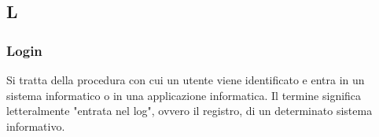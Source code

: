 \subsection{L}

\subsubsection{Login}
Si tratta della procedura con cui un utente viene identificato e entra in un sistema informatico o in una applicazione informatica.
Il termine significa letteralmente "entrata nel log", ovvero il registro, di un determinato sistema informativo.